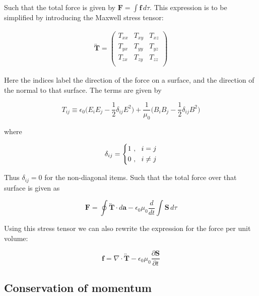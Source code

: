 \documentclass[a4paper]{article}
\begin{document}
Such that the total force is given by $\bm{F}=\int \bm{f}\,d\tau$. This expression is to be simplified by introducing the Maxwell stress tensor:

\begin{gather}
    \overleftrightarrow{\bm{T}}
    = 
    \begin{pmatrix}
        T_{xx}& T_{xy} & T_{xz}\\
        T_{yx} & T_{yy} & T_{yz}\\
        T_{zx} & T_{zy} & T_{zz}\\
    \end{pmatrix}
\end{gather}

Here the indices label the direction of the force on a surface, and the direction of the normal to that surface. The terms are given by

\begin{equation}
    T_{ij}\equiv \epsilon_0\bigg(E_iE_j-\frac{1}{2}\delta_{ij}E^2\bigg)+\frac{1}{\mu_0}\bigg(B_iB_j-\frac{1}{2}\delta_{ij}B^2\bigg)
\end{equation}

where 

\begin{equation}
    \delta_{ij}
    =
    \begin{dcases}
        1\ ,\ \ i=j \\
        0\ ,\ \ i\not=j \\
    \end{dcases}
\end{equation}

Thus $\delta_{ij}=0$ for the non-diagonal items.
Such that the total force over that surface is given as

\begin{equation}
    \bm{F}=\oint \overleftrightarrow{\bm{T}}\cdot d\bm{a}-\epsilon_0\mu_0\frac{d}{dt}\int\bm{S}\,d\tau
\end{equation}

Using this stress tensor we can also rewrite the expression for the force per unit volume:

\begin{equation}
        \bm{f} =\nabla\cdot\overleftrightarrow{\bm{T}} -\epsilon_0\mu_0\frac{\partial\bm{S}}{\partial t}
\end{equation}

\subsection{Conservation of momentum}
\end{document}
